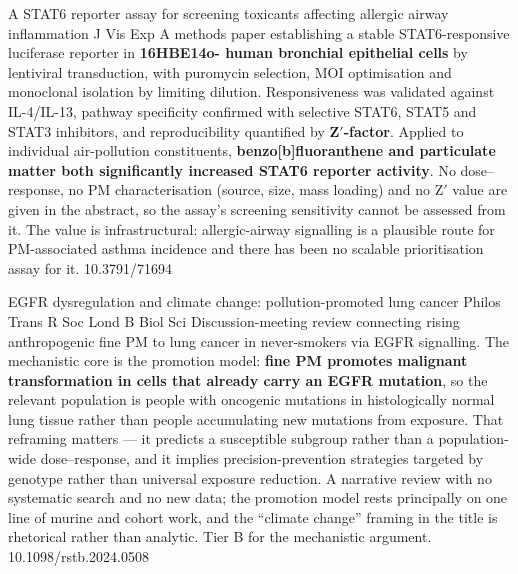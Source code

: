 \documentclass[10pt]{article}
\begin{document}
{A STAT6 reporter assay for screening toxicants affecting allergic airway inflammation}
{J Vis Exp}
{A methods paper establishing a stable STAT6-responsive luciferase reporter in
\textbf{16HBE14o- human bronchial epithelial cells} by lentiviral transduction, with
puromycin selection, MOI optimisation and monoclonal isolation by limiting dilution.
Responsiveness was validated against IL-4/IL-13, pathway specificity confirmed with
selective STAT6, STAT5 and STAT3 inhibitors, and reproducibility quantified by
\textbf{Z$'$-factor}. Applied to individual air-pollution constituents,
\textbf{benzo[b]fluoranthene and particulate matter both significantly increased STAT6
reporter activity}. No dose--response, no PM characterisation (source, size, mass
loading) and no Z$'$ value are given in the abstract, so the assay's screening
sensitivity cannot be assessed from it. The value is infrastructural: allergic-airway
signalling is a plausible route for PM-associated asthma incidence and there has been no
scalable prioritisation assay for it.}
{10.3791/71694}

{EGFR dysregulation and climate change: pollution-promoted lung cancer}
{Philos Trans R Soc Lond B Biol Sci}
{Discussion-meeting review connecting rising anthropogenic fine PM to lung cancer in
never-smokers via EGFR signalling. The mechanistic core is the promotion model:
\textbf{fine PM promotes malignant transformation in cells that already carry an EGFR
mutation}, so the relevant population is people with oncogenic mutations in
histologically normal lung tissue rather than people accumulating new mutations from
exposure. That reframing matters --- it predicts a susceptible subgroup rather than a
population-wide dose--response, and it implies precision-prevention strategies targeted
by genotype rather than universal exposure reduction. A narrative review with no
systematic search and no new data; the promotion model rests principally on one line of
murine and cohort work, and the ``climate change'' framing in the title is rhetorical
rather than analytic. Tier B for the mechanistic argument.}
{10.1098/rstb.2024.0508}

\end{document}
